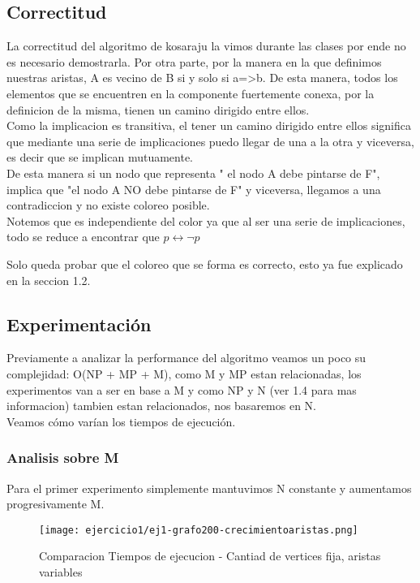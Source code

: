 \subsection{Correctitud}
La correctitud del algoritmo de kosaraju la vimos durante las clases por ende no es necesario demostrarla. Por otra parte, por la manera en la que definimos nuestras aristas, A es vecino de B si y solo si a=>b. De esta manera, todos los elementos que se encuentren en la componente fuertemente conexa, por la definicion de la misma, tienen un camino dirigido entre ellos.\\
Como la implicacion es transitiva, el tener un camino dirigido entre ellos significa que mediante una serie de implicaciones puedo llegar de una a la otra y viceversa, es decir que se implican mutuamente.\\
De esta manera si un nodo que representa " el nodo A debe pintarse de F", implica que "el nodo A NO debe pintarse de F" y viceversa, llegamos a una contradiccion y no existe coloreo posible.\\
Notemos que es independiente del color ya que al ser una serie de implicaciones, todo se reduce a encontrar que $p \leftrightarrow \neg p$

Solo queda probar que el coloreo que se forma es correcto, esto ya fue explicado en la seccion 1.2. 

\pagebreak

\subsection{Experimentaci\'on}
Previamente a analizar la performance del algoritmo veamos un poco su complejidad: O(NP + MP + M), como M y MP estan relacionadas, los experimentos van a ser en base a M y como NP y N (ver 1.4 para mas informacion) tambien estan relacionados, nos basaremos en N.\\
Veamos c\'omo var\'ian los tiempos de ejecuci\'on.

\subsubsection{Analisis sobre M}

Para el primer experimento simplemente mantuvimos N constante y aumentamos progresivamente M.
\begin{figure}[h!]
\texttt{[image: ejercicio1/ej1-grafo200-crecimientoaristas.png]}
\centering 
\caption{Comparacion Tiempos de ejecucion - Cantiad de vertices fija, aristas variables}
\label{overflow3}
\end{figure}

